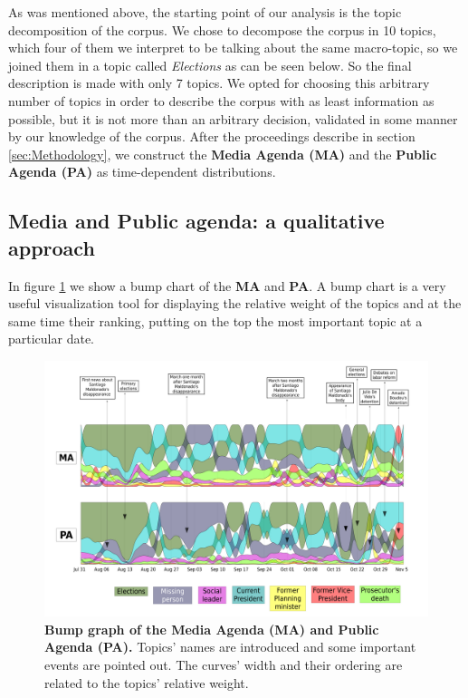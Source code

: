 
\par As was mentioned above, the starting point of our analysis is the topic decomposition of the corpus.
We chose to decompose the corpus in 10 topics, which four of them we interpret to be talking about the same macro-topic, so we joined them in a topic called \emph{Elections} as can be seen below. So the final description is made with only 7 topics.
We opted for choosing this arbitrary number of topics in order to describe the corpus with as least information as possible, but it is not more than an arbitrary decision, validated in some manner by our knowledge of the corpus.
After the proceedings describe in section \ref{sec:Methodology}, we construct the \textbf{Media Agenda (MA)} and the \textbf{Public Agenda (PA)} as time-dependent distributions. 

\subsection{Media and Public agenda: a qualitative approach}

\par In figure \ref{fig:all_agenda} we show a bump chart of the \textbf{MA} and \textbf{PA}. A bump chart is a very useful visualization tool for displaying the relative weight of the topics and at the same time their ranking, putting on the top the most important topic at a particular date.

\begin{landscape}
\begin{figure}[h]
\includegraphics[height = \textheight]{images/Fig1.pdf}
\caption{\textbf{Bump graph of the Media Agenda (MA) and Public Agenda (PA).} Topics’ names are introduced and some important events are pointed out. The curves’ width and their ordering are related to the topics’ relative weight.}
\label{fig:all_agenda}
\end{figure}
\end{landscape}
 
